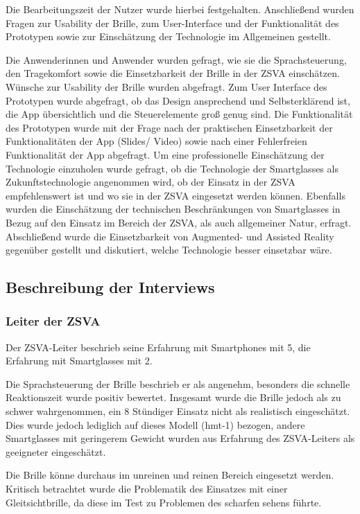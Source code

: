 Die Bearbeitungszeit der Nutzer wurde hierbei festgehalten. Anschließend wurden Fragen zur Usability der Brille, zum User-Interface und der Funktionalität des Prototypen sowie zur Einschätzung der Technologie im Allgemeinen gestellt.

Die Anwenderinnen und Anwender wurden gefragt, wie sie die Sprachsteuerung, den Tragekomfort sowie die Einsetzbarkeit der Brille in der ZSVA einschätzen. Wünsche zur Usability der Brille wurden abgefragt. Zum User Interface des Prototypen wurde abgefragt, ob das Design ansprechend und Selbsterklärend ist, die App übersichtlich und die Steuerelemente groß genug sind. Die Funktionalität des Prototypen wurde mit der Frage nach der praktischen Einsetzbarkeit der Funktionalitäten der App (Slides/ Video) sowie nach einer Fehlerfreien Funktionalität der App abgefragt. Um eine professionelle Einschätzung der Technologie einzuholen wurde gefragt, ob die Technologie der Smartglasses als Zukunftstechnologie angenommen wird, ob der Einsatz in der ZSVA empfehlenswert ist und wo sie in der ZSVA eingesetzt werden können. Ebenfalls wurden die Einschätzung der technischen Beschränkungen von Smartglasses in Bezug auf den Einsatz im Bereich der ZSVA, als auch allgemeiner Natur, erfragt. Abschließend wurde die Einsetzbarkeit von Augmented- und Assisted Reality gegenüber gestellt und diskutiert, welche Technologie besser einsetzbar wäre.
%
%
%
%
%
%
%
\subsection{Beschreibung der Interviews}
\label{sec:Beschreinung_der_Interviews}
%
\subsubsection{Leiter der ZSVA}
%
Der ZSVA-Leiter beschrieb seine Erfahrung mit Smartphones mit 5, die Erfahrung mit Smartglasses mit 2.

Die Sprachsteuerung der Brille beschrieb er als angenehm, besonders die schnelle Reaktionszeit wurde positiv bewertet. Insgesamt wurde die Brille jedoch als zu schwer wahrgenommen, ein 8 Stündiger Einsatz nicht als realistisch eingeschätzt. Dies wurde jedoch lediglich auf dieses Modell (hmt-1) bezogen, andere Smartglasses mit geringerem Gewicht wurden aus Erfahrung des ZSVA-Leiters als geeigneter eingeschätzt.

Die Brille könne durchaus im unreinen und reinen Bereich eingesetzt werden. Kritisch betrachtet wurde die Problematik des Einsatzes mit einer Gleitsichtbrille, da diese im Test zu Problemen des scharfen sehens führte.

